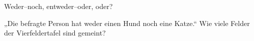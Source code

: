 \setcounter{aufgabe}{7}

\begin{aufgabe}{Weder–noch, entweder–oder, oder?}
\begin{teile}
\teil „Die befragte Person hat weder einen Hund noch eine Katze.“ Wie viele Felder der Vierfeldertafel sind gemeint? \\  \\  \\ 
\end{teile}
\end{aufgabe}

